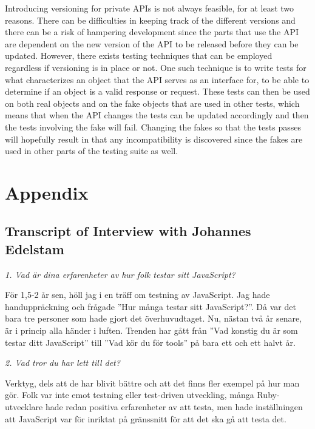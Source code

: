 \documentclass[11pt]{article}
\begin{document}
Introducing versioning for private APIs is not always feasible, for at least two reasons. There can be difficulties in keeping track of the different versions and there can be a risk of hampering development since the parts that use the API are dependent on the new version of the API to be released before they can be updated. However, there exists testing techniques that can be employed regardless if versioning is in place or not. One such technique is to write tests for what characterizes an object that the API serves as an interface for, to be able to determine if an object is a valid response or request. These tests can then be used on both real objects and on the fake objects that are used in other tests, which means that when the API changes the tests can be updated accordingly and then the tests involving the fake will fail. Changing the fakes so that the tests passes will hopefully result in that any incompatibility is discovered since the fakes are used in other parts of the testing suite as well. \cite[question~34]{Edelstam}

\printbibliography[heading=bibnumbered]

\section{Appendix}

\subsection{Transcript of Interview with Johannes Edelstam}

\emph{1. Vad är dina erfarenheter av hur folk testar sitt JavaScript?}

För 1,5-2 år sen, höll jag i en träff om testning av JavaScript. Jag hade handuppräckning och frågade ”Hur många testar sitt JavaScript?”. Då var det bara tre personer som hade gjort det överhuvudtaget. Nu, nästan två år senare, är i princip alla händer i luften. Trenden har gått från ”Vad konstig du är som testar ditt JavaScript” till ”Vad kör du för tools” på bara ett och ett halvt år.

\emph{2. Vad tror du har lett till det?}

Verktyg, dels att de har blivit bättre och att det finns fler exempel på hur man gör. Folk var inte emot testning eller test-driven utveckling, många Ruby-utvecklare hade redan positiva erfarenheter av att testa, men hade inställningen att JavaScript var för inriktat på gränssnitt för att det ska gå att testa det.
\end{document}
